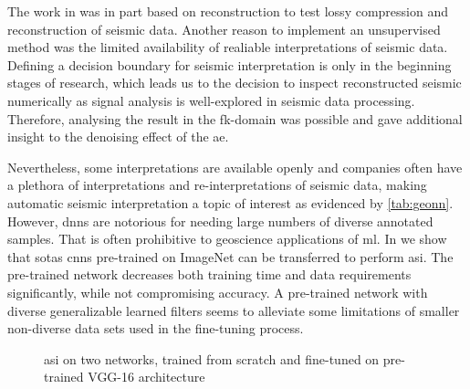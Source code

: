 The work in  was in part based on reconstruction to test lossy compression and reconstruction of seismic data. Another reason to implement an unsupervised method was the limited availability of realiable interpretations of seismic data. Defining a decision boundary for seismic interpretation is only in the beginning stages of research, which leads us to the decision to inspect reconstructed seismic numerically as signal analysis is well-explored in seismic data processing. Therefore, analysing the result in the \ac{fk}-domain was possible and gave additional insight to the denoising effect of the \ac{ae}.

Nevertheless, some interpretations are available openly and companies often have a plethora of interpretations and re-interpretations of seismic data, making automatic seismic interpretation a topic of interest as evidenced by \cref{tab:geonn}. However, \aclp{dnn} are notorious for needing large numbers of diverse annotated samples. That is often prohibitive to geoscience applications of \acl{ml}. In  we show that \aclp{sota} \aclp{cnn} pre-trained on ImageNet can be transferred to perform \acl{asi}. The pre-trained network decreases both training time and data requirements significantly, while not compromising accuracy. A pre-trained network with diverse generalizable learned filters seems to alleviate some limitations of smaller non-diverse data sets used in the fine-tuning process.

\begin{figure}[!ht]
\caption{\acl{asi} on two networks, trained from scratch and fine-tuned on pre-trained VGG-16 architecture}
\label{fig:asi}
\end{figure}

